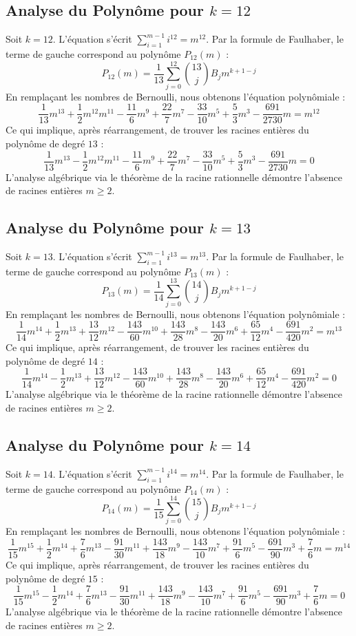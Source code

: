 \documentclass[11pt,a4paper]{article}
\begin{document}
\subsection{Analyse du Polynôme pour $k = 12$}
Soit $k = 12$. L'équation s'écrit $\sum_{i=1}^{m-1} i^{12} = m^{12}$.
Par la formule de Faulhaber, le terme de gauche correspond au polynôme $P_{12}(m)$ :
$$ P_{12}(m) = \frac{1}{13} \sum_{j=0}^{12} \binom{13}{j} B_j m^{k+1-j} $$
En remplaçant les nombres de Bernoulli, nous obtenons l'équation polynômiale :
$$ \frac{1}{13} m^13+\frac{1}{2} m^12m^11-\frac{11}{6} m^9+\frac{22}{7} m^7-\frac{33}{10} m^5+\frac{5}{3} m^3-\frac{691}{2730} m = m^{12} $$
Ce qui implique, après réarrangement, de trouver les racines entières du polynôme de degré $13$ :
$$ \frac{1}{13} m^13-\frac{1}{2} m^12m^11-\frac{11}{6} m^9+\frac{22}{7} m^7-\frac{33}{10} m^5+\frac{5}{3} m^3-\frac{691}{2730} m = 0 $$
L'analyse algébrique via le théorème de la racine rationnelle démontre l'absence de racines entières $m \geq 2$.

\subsection{Analyse du Polynôme pour $k = 13$}
Soit $k = 13$. L'équation s'écrit $\sum_{i=1}^{m-1} i^{13} = m^{13}$.
Par la formule de Faulhaber, le terme de gauche correspond au polynôme $P_{13}(m)$ :
$$ P_{13}(m) = \frac{1}{14} \sum_{j=0}^{13} \binom{14}{j} B_j m^{k+1-j} $$
En remplaçant les nombres de Bernoulli, nous obtenons l'équation polynômiale :
$$ \frac{1}{14} m^14+\frac{1}{2} m^13+\frac{13}{12} m^12-\frac{143}{60} m^10+\frac{143}{28} m^8-\frac{143}{20} m^6+\frac{65}{12} m^4-\frac{691}{420} m^2 = m^{13} $$
Ce qui implique, après réarrangement, de trouver les racines entières du polynôme de degré $14$ :
$$ \frac{1}{14} m^14-\frac{1}{2} m^13+\frac{13}{12} m^12-\frac{143}{60} m^10+\frac{143}{28} m^8-\frac{143}{20} m^6+\frac{65}{12} m^4-\frac{691}{420} m^2 = 0 $$
L'analyse algébrique via le théorème de la racine rationnelle démontre l'absence de racines entières $m \geq 2$.

\subsection{Analyse du Polynôme pour $k = 14$}
Soit $k = 14$. L'équation s'écrit $\sum_{i=1}^{m-1} i^{14} = m^{14}$.
Par la formule de Faulhaber, le terme de gauche correspond au polynôme $P_{14}(m)$ :
$$ P_{14}(m) = \frac{1}{15} \sum_{j=0}^{14} \binom{15}{j} B_j m^{k+1-j} $$
En remplaçant les nombres de Bernoulli, nous obtenons l'équation polynômiale :
$$ \frac{1}{15} m^15+\frac{1}{2} m^14+\frac{7}{6} m^13-\frac{91}{30} m^11+\frac{143}{18} m^9-\frac{143}{10} m^7+\frac{91}{6} m^5-\frac{691}{90} m^3+\frac{7}{6} m = m^{14} $$
Ce qui implique, après réarrangement, de trouver les racines entières du polynôme de degré $15$ :
$$ \frac{1}{15} m^15-\frac{1}{2} m^14+\frac{7}{6} m^13-\frac{91}{30} m^11+\frac{143}{18} m^9-\frac{143}{10} m^7+\frac{91}{6} m^5-\frac{691}{90} m^3+\frac{7}{6} m = 0 $$
L'analyse algébrique via le théorème de la racine rationnelle démontre l'absence de racines entières $m \geq 2$.
\end{document}

